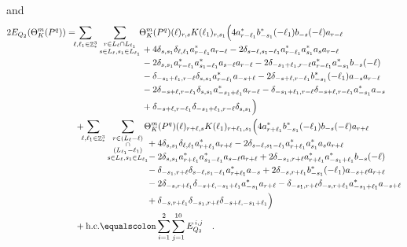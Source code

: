 \documentclass[sn-mathphys, Numbered ,a4paper]{sn-jnl}%
\DeclareMathOperator{\Z}{\mathbb{Z}}
\theoremstyle{plain}
\theoremstyle{definition}
\theoremstyle{remark}
\theoremstyle{plain}
\theoremstyle{definition}
\theoremstyle{remark}
\begin{document}
and
\begin{alignat}{2}
	2E_{Q_2}(\Theta^m_{K}(P^q)) &=
	\!\!\!\sum\limits_{\ell,\ell_1 \in \Z^3_*}\sum\limits_{\substack{r\in L_{\ell} \cap L_{\ell_1}\\ s \in L_{\ell},s_1\in L_{\ell_1}}} \!\!\!\begin{aligned}[t] &\Theta^m_{K}(P^q)(\ell)_{r,s}K(\ell_1)_{r,s_1}\Big( 4a^*_{r-\ell_1}b^*_{-s_1}(-\ell_1)b_{-s}(-\ell)a_{r-\ell} \nonumber\\ 
		&\;+ 4\delta_{s,s_1} \delta_{\ell,\ell_1 } a^*_{r-\ell_1} a_{r-\ell} -2\delta_{s-\ell,s_1-\ell_1}a^*_{r-\ell_1} a^*_{s_1} a_{s} a_{r-\ell} \nonumber\\
		&\;-2\delta_{s,s_1}a^*_{r-\ell_1} a^*_{s_1-\ell_1}a_{s-\ell} a_{r-\ell} - 2\delta_{-s_1+\ell_1,r-\ell} a^*_{r-\ell_1} a^*_{-s_1} b_{-s}(-\ell)\nonumber\\
		&\;-\delta_{-s_1+\ell_1,r-\ell}\delta_{s,s_1}a^*_{r-\ell_1}a_{-s+\ell} - 2\delta_{-s+\ell,r-\ell_1}b^*_{-s_1}(-\ell_1)a_{-s}a_{r-\ell} \nonumber\\
		&\;-2\delta_{-s+\ell,r-\ell_1}\delta_{s,s_1}a^*_{-s_1+\ell_1} a_{r-\ell} - \delta_{-s_1+\ell_1,r-\ell}\delta_{-s+\ell,r-\ell_1}a^*_{-s_1}a_{-s} \nonumber\\
		&\;+\delta_{-s+\ell,r-\ell_1}\delta_{-s_1+\ell_1,r-\ell}\delta_{s,s_1}  \Big)    
	\end{aligned}\\
	&\quad +\!\!\!\sum\limits_{\ell,\ell_1 \in \Z^3_*}\sum\limits_{\substack{r\in (L_{\ell}-\ell)\\ \cap \\(L_{\ell_1}-\ell_1)\\ s \in L_{\ell},s_1\in L_{\ell_1}}}\!\!\!\!\!\begin{aligned}[t] &\Theta^m_{K}(P^q)(\ell)_{r+\ell,s}K(\ell_1)_{r+\ell_1,s_1}\Big(4a^*_{r+\ell_1}b^*_{-s_1}(-\ell_1)b_{-s}(-\ell)a_{r+\ell} \nonumber\\
		&\;+ 4\delta_{s,s_1} \delta_{\ell,\ell_1 } a^*_{r+\ell_1} a_{r+\ell} -2\delta_{s-\ell,s_1-\ell_1}a^*_{r+\ell_1} a^*_{s_1} a_{s} a_{r+\ell} \nonumber\\
		&\;-2\delta_{s,s_1}a^*_{r+\ell_1} a^*_{s_1-\ell_1}a_{s-\ell} a_{r+\ell} + 2 \delta_{-s_1, r+\ell}a^*_{r+\ell_1}a^*_{-s_1+\ell_1}b_{-s}(-\ell)\nonumber\\
		&\;-\delta_{-s_1,r+\ell}\delta_{s-\ell,s_1-\ell_1}a^*_{r+\ell_1}a_{-s} + 2\delta_{-s,r+\ell_1}b^*_{-s_1}(-\ell_1)a_{-s+\ell}a_{r+\ell} \nonumber\\
		&\;-2\delta_{-s,r+\ell_1}\delta_{-s+\ell,-s_1+\ell_1}a^*_{-s_1}a_{r+\ell} - \delta_{-s_1,r+\ell}\delta_{-s,r+\ell_1}a^*_{-s_1+\ell_1}a_{-s+\ell}\nonumber\\
		&\;+ \delta_{-s,r+\ell_1} \delta_{-s_1,r+\ell} \delta_{-s+\ell,-s_1+\ell_1} \Big)  
	\end{aligned}\\
	&\quad +\mathrm{h.c.} \equalscolon \sum\limits_{i=1}^{2}\sum\limits_{j=1}^{10} E_{Q_2}^{\,i,j}\nonumber\quad.
\end{alignat}
\end{document}
